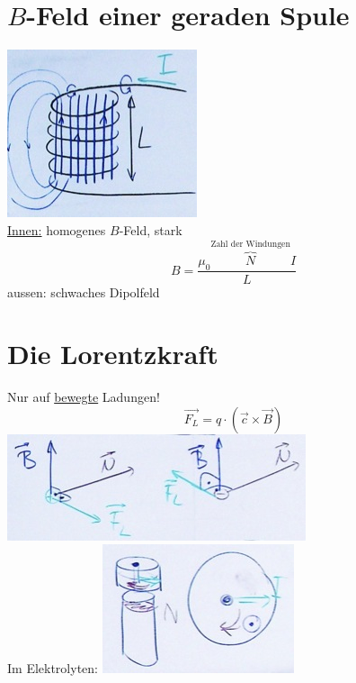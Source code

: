 \section{\texorpdfstring{$B$}{B}-Feld einer geraden Spule}
\includegraphics{Bild197} \\
\uline{Innen:} homogenes $B$-Feld, stark
\[ \boxed{ B = \frac{\mu_0 \overbrace{N}^{\text{Zahl der Windungen}} I}{L} } \]
aussen: schwaches Dipolfeld

\section{Die Lorentzkraft}
Nur auf \uline{bewegte} Ladungen!
\[ \boxed{ \vec{F_L} = q \cdot ( \vec{c} \times \vec{B} ) } \]
\includegraphics{Bild198} \\
Im Elektrolyten:
\includegraphics{Bild199}

